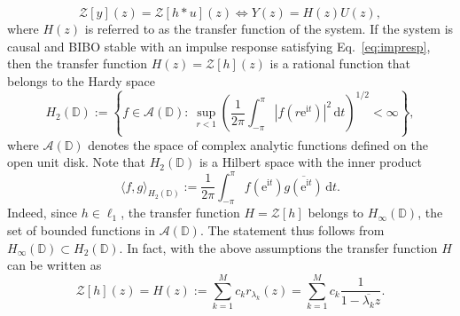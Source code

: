 \documentclass{arxiv}
\newcommand{\e}{\mathrm{e}}
\newcommand{\ri}{\mathrm{i}}
\renewcommand{\d}{\mathrm{d}}
\begin{document}
\begin{equation}
    \label{eq:sisofreq}
    \mathcal{Z}[y](z) = \mathcal{Z}[h \ast u](z) \iff Y(z) = H(z) U(z),
\end{equation}
where $H(z)$ is referred to as the transfer function of the system. If the system is causal and BIBO stable with an impulse response satisfying Eq.~\eqref{eq:impresp}, then the transfer function $H(z) = \mathcal{Z}[h](z)$ is a rational function that belongs to the Hardy space 
\begin{equation*}
    H_{2}(\mathbb{D}) := \left\{ f \in \mathcal{A}(\mathbb{D}) : \ \sup_{r < 1} \left( \frac{1}{2 \pi} \int_{-\pi}^{\pi} \left| f(r \e^{\ri t}) \right|^2 \,\d t \right)^{1/2} < \infty \right\},
\end{equation*}
where $\mathcal{A}(\mathbb{D})$ denotes the space of complex analytic functions defined on the open unit disk. Note that $H_{2}(\mathbb{D})$ is a Hilbert space with the inner product
\begin{equation}\label{eq:H2def}
 {\langle f,g \rangle}_{H_{2}(\mathbb{D})} := \frac{1}{2 \pi} \int_{-\pi}^{\pi} f(\e^{\ri t})\overline{g(\e^{\ri t})} \,\d t.
\end{equation}
Indeed, since $h \in \ell_1$, the transfer function $H = \mathcal{Z}[h]$ belongs to $H_{\infty}(\mathbb{D})$, the set of bounded functions in $\mathcal{A}(\mathbb{D})$. The statement thus follows from $H_{\infty} (\mathbb{D})\subset H_2(\mathbb{D}) $. In fact, with the above assumptions the transfer function $H$ can be written as
\begin{equation}
   \label{eq:trfH}
   \mathcal{Z}[h](z) = H(z) := \sum_{k=1}^{M} c_k r_{\lambda_k}(z) = \sum_{k=1}^{M} c_k \frac{1}{1 - \overline{\lambda_k}z}.
\end{equation}
\end{document}
